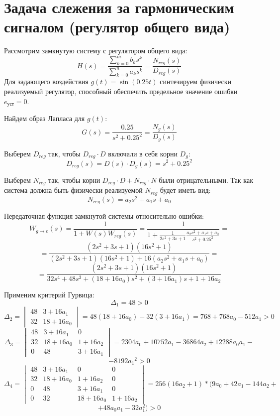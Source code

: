 \chapter{Задача слежения за гармоническим сигналом (регулятор общего вида)}

Рассмотрим замкнутую систему с регулятором общего вида:
\[
H(s) = \frac{\sum_{k=0}^m b_k s^k}{\sum_{k=0}^n a_k s^k} = \frac{N_{reg}(s)}{D_{reg}(s)}
\]
Для задающего воздействия $g(t) = \sin(0.25 t)$ синтезируем физически 
реализуемый регулятор, способный обеспечить предельное значение ошибки 
$e_{\text{уст}} = 0$.

Найдем образ Лапласа для $g(t)$:
\[
G(s) = \frac{0.25}{s^2 + 0.25^2} = \frac{N_g(s)}{D_g(s)}
\]

Выберем $D_{reg}$ так, чтобы $D_{reg}\cdot D$ включали в себя корни $D_g$:
\[
D_{reg}(s) = D(s) \cdot D_g(s) = s^2 + 0.25^2
\]

Выберем $N_{reg}$ так, чтобы корни $D_{reg}\cdot D + N_{reg}\cdot N$ 
были отрицательными. Так как система должна быть физически реализуемой
$N_{reg}$ будет иметь вид:
\[
N_{reg}(s) = a_2 s^2 + a_1 s + a_0
\]

Передаточная функция замкнутой системы относительно ошибки:
\[
W_{g\to e}(s) = \frac{1}{1+W(s)W_{reg}(s)} 
= \frac{1}{1 + \frac{1}{2s^2 + 3s + 1} \frac{a_2 s^2 + a_1 s + a_0}{s^2 + 0.25^2}}
=
\]
\[
= \frac{(2s^2 + 3s + 1)(16s^2 + 1)}{(2s^2 + 3s + 1)(16s^2 + 1) + 16(a_2 s^2 + a_1 s + a_0)}
=
\]
\[
= \frac{(2s^2 + 3s + 1)(16s^2 + 1)}{32s^4 + 48s^3 + (18 + 16a_0)s^2 + (3 + 16a_1)s + 1 + 16a_2}
\]

Применим критерий Гурвица:
\[
    \Delta_1 = 48 > 0
\]
\[
    \Delta_2 = 
    \begin{vmatrix}
        48 & 3 + 16a_1 \\
        32 & 18 + 16a_0
    \end{vmatrix}
    = 48(18 + 16a_0) - 32(3 + 16a_1) =
    768 + 768a_0 - 512a_1 >0
\]
\[
    \Delta_3 = 
    \begin{vmatrix}
        48 & 3 + 16a_1 & 0 \\
        32 & 18 + 16a_0 & 1 + 16a_2 \\
        0 & 48 & 3 + 16a_1
    \end{vmatrix}
    = 2304a_{0}+10752a_{1}-36864a_{2}+12288a_{0}a_{1}
    -
    \]\[
    -8192{a_{1}}^2> 0
\]
\[
    \Delta_4 = 
    \begin{vmatrix}
        48 & 3 + 16a_1 & 0 & 0 \\
        32 & 18 + 16a_0 & 1 + 16a_2 & 0 \\
        0 & 48 & 3 + 16a_1 & 0 \\
        0 & 32 & 18 + 16a_0 & 1 + 16a_2
    \end{vmatrix}
    = 256(16a_2 + 1)*(9a_0 + 42a_1 - 144a_2 
    +
    \]\[
    + 48a_0a_1 - 32a_1^2)> 0
\]

